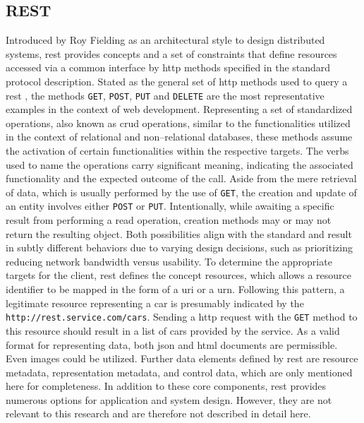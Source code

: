 \subsection{REST}
\label{ch:Fundamentals:sec:Data Exchange:ssec:REST}

Introduced by Roy Fielding as an architectural style \cite{patni_pro_2017} to design distributed systems, \acrfull{rest} provides concepts and a set of constraints that define resources accessed via a common interface by \acrshort{http} methods specified in the standard protocol description.
Stated as the general set of \acrshort{http} methods used to query a \acrshort{rest} , the methods \verb|GET|, \verb|POST|, \verb|PUT| and \verb|DELETE| are the most representative examples in the context of web development. 
Representing a set of standardized operations, also known as \acrshort{crud} operations, similar to the functionalities utilized in the context of relational and non--relational databases, these methods assume the activation of certain functionalities within the respective targets.
The verbs used to name the operations carry significant meaning, indicating the associated functionality and the expected outcome of the call.
Aside from the mere retrieval of data, which is usually performed by the use of \verb|GET|, the creation and update of an entity involves either \verb|POST| or \verb|PUT|.
Intentionally, while awaiting a specific result from performing a read operation, creation methods may or may not return the resulting object. Both possibilities align with the standard and result in subtly different behaviors due to varying design decisions, such as prioritizing reducing network bandwidth versus usability.
To determine the appropriate targets for the client, \acrshort{rest} defines the concept resources, which allows a resource identifier to be mapped in the form of a \acrshort{uri} or a \acrshort{urn}. Following this pattern, a legitimate resource representing a car is presumably indicated by the  \verb|http://rest.service.com/cars|. 
Sending a \acrshort{http} request with the \verb|GET| method to this resource should result in a list of cars provided by the service. As a valid format for representing data, both \acrshort{json} and \acrshort{html} documents are permissible. Even images could be utilized.
Further data elements defined by \acrshort{rest} are resource metadata, representation metadata, and control data, which are only mentioned here for completeness. 
In addition to these core components, \acrshort{rest} provides numerous options for application and system design. However, they are not relevant to this research and are therefore not described in detail here.

